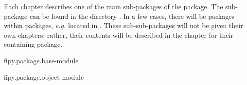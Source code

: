 \begin{FiPyDocumentationExample}
    
    \chapterheadstart
    {
     \afterchaptertitle
    }
    
    Each chapter describes one of the main sub-packages of the
     package.  The sub-package
     can be found in the
    directory .  In a few cases, there will be
    packages within packages, \emph{e.g.}
     located in
    .  These sub-sub-packages
    will not be given their own chapters; rather, their contents will
    be described in the chapter for their containing package.

    {fipy.package.base-module}
%     
\end{FiPyDocumentationExample}

\begin{FiPyDocumentationExample}
    {fipy.package.object-module}
%     
\end{FiPyDocumentationExample}

%     


